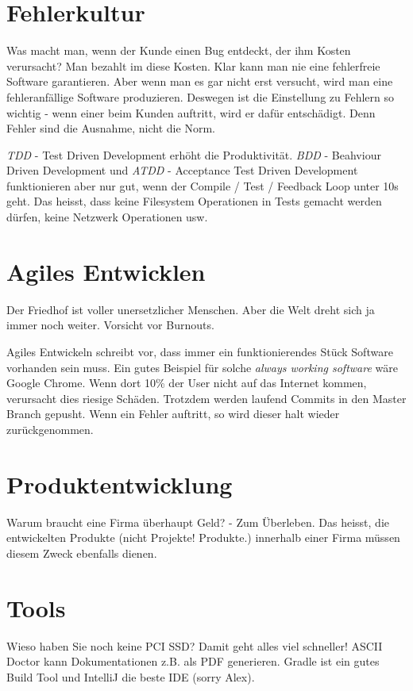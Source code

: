 \section{Fehlerkultur}
Was macht man, wenn der Kunde einen Bug entdeckt, der ihm Kosten verursacht? Man bezahlt im diese Kosten. Klar kann man nie eine fehlerfreie Software garantieren. Aber wenn man es gar nicht erst versucht, wird man eine fehleranfällige Software produzieren. Deswegen ist die Einstellung zu Fehlern so wichtig - wenn einer beim Kunden auftritt, wird er dafür entschädigt. Denn Fehler sind die Ausnahme, nicht die Norm.

\textit{TDD} - Test Driven Development erhöht die Produktivität. \textit{BDD} - Beahviour Driven Development und \textit{ATDD} - Acceptance Test Driven Development funktionieren aber nur gut, wenn der Compile / Test / Feedback Loop unter 10s geht. Das heisst, dass keine Filesystem Operationen in Tests gemacht werden dürfen, keine Netzwerk Operationen usw.

\section{Agiles Entwicklen}
Der Friedhof ist voller unersetzlicher Menschen. Aber die Welt dreht sich ja immer noch weiter. Vorsicht vor Burnouts.

Agiles Entwickeln schreibt vor, dass immer ein funktionierendes Stück Software vorhanden sein muss. Ein gutes Beispiel für solche \textit{always working software} wäre Google Chrome. Wenn dort 10\% der User nicht auf das Internet kommen, verursacht dies riesige Schäden. Trotzdem werden laufend Commits in den Master Branch gepusht. Wenn ein Fehler auftritt, so wird dieser halt wieder zurückgenommen.

\section{Produktentwicklung}
Warum braucht eine Firma überhaupt Geld? - Zum Überleben. Das heisst, die entwickelten Produkte (nicht Projekte! Produkte.) innerhalb einer Firma müssen diesem Zweck ebenfalls dienen.

\section{Tools}
Wieso haben Sie noch keine PCI SSD? Damit geht alles viel schneller! ASCII Doctor kann Dokumentationen z.B. als PDF generieren. Gradle ist ein gutes Build Tool und IntelliJ die beste IDE (sorry Alex).
